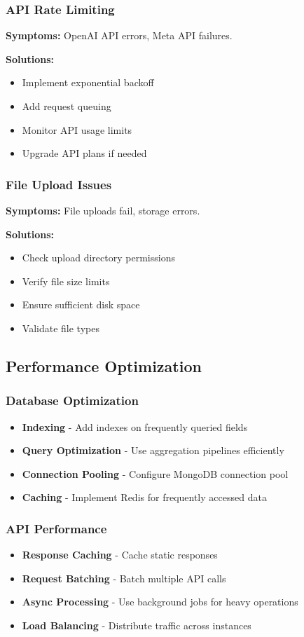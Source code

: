 \documentclass[12pt,a4paper]{article}
\begin{document}
\subsubsection{API Rate Limiting}
\textbf{Symptoms:} OpenAI API errors, Meta API failures.

\textbf{Solutions:}
\begin{itemize}
    \item Implement exponential backoff
    \item Add request queuing
    \item Monitor API usage limits
    \item Upgrade API plans if needed
\end{itemize}

\subsubsection{File Upload Issues}
\textbf{Symptoms:} File uploads fail, storage errors.

\textbf{Solutions:}
\begin{itemize}
    \item Check upload directory permissions
    \item Verify file size limits
    \item Ensure sufficient disk space
    \item Validate file types
\end{itemize}

\subsection{Performance Optimization}

\subsubsection{Database Optimization}
\begin{itemize}
    \item \textbf{Indexing} - Add indexes on frequently queried fields
    \item \textbf{Query Optimization} - Use aggregation pipelines efficiently
    \item \textbf{Connection Pooling} - Configure MongoDB connection pool
    \item \textbf{Caching} - Implement Redis for frequently accessed data
\end{itemize}

\subsubsection{API Performance}
\begin{itemize}
    \item \textbf{Response Caching} - Cache static responses
    \item \textbf{Request Batching} - Batch multiple API calls
    \item \textbf{Async Processing} - Use background jobs for heavy operations
    \item \textbf{Load Balancing} - Distribute traffic across instances
\end{itemize}
\end{document}
